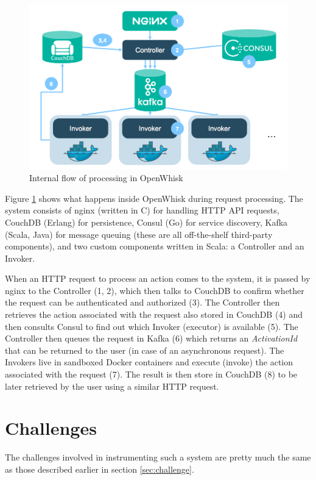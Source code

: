 \begin{figure}[htb]
\centering
\includegraphics[scale=0.4]{./OpenWhisk_flow_of_processing}
\caption{Internal flow of processing in OpenWhisk}
\label{fig:owflow}
\end{figure}

Figure \ref{fig:owflow} shows what happens inside OpenWhisk during request processing. The system consists of nginx (written in C) for handling HTTP API requests, CouchDB (Erlang) for persistence, Consul (Go) for service discovery, Kafka (Scala, Java) for message queuing (these are all off-the-shelf third-party components), and two custom components written in Scala: a Controller and an Invoker.

When an HTTP request to process an action comes to the system, it is passed by nginx to the Controller (1, 2), which then talks to CouchDB to confirm whether the request can be authenticated and authorized (3). The Controller then retrieves the action associated with the request also stored in CouchDB (4) and then consults Consul to find out which Invoker (executor) is available (5). The Controller then queues the request in Kafka (6) which returns an \emph{ActivationId} that can be returned to the user (in case of an asynchronous request). The Invokers live in sandboxed Docker containers and execute (invoke) the action associated with the request (7). The result is then store in CouchDB (8) to be later retrieved by the user using a similar HTTP request.

\section{Challenges}

The challenges involved in instrumenting such a system are pretty much the same as those described earlier in section \ref{sec:challenge}.

